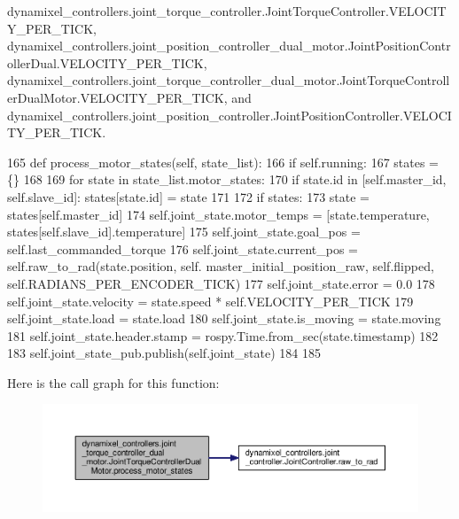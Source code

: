 dynamixel\+\_\+controllers.\+joint\+\_\+torque\+\_\+controller.\+Joint\+Torque\+Controller.\+V\+E\+L\+O\+C\+I\+T\+Y\+\_\+\+P\+E\+R\+\_\+\+T\+I\+CK, dynamixel\+\_\+controllers.\+joint\+\_\+position\+\_\+controller\+\_\+dual\+\_\+motor.\+Joint\+Position\+Controller\+Dual.\+V\+E\+L\+O\+C\+I\+T\+Y\+\_\+\+P\+E\+R\+\_\+\+T\+I\+CK, dynamixel\+\_\+controllers.\+joint\+\_\+torque\+\_\+controller\+\_\+dual\+\_\+motor.\+Joint\+Torque\+Controller\+Dual\+Motor.\+V\+E\+L\+O\+C\+I\+T\+Y\+\_\+\+P\+E\+R\+\_\+\+T\+I\+CK, and dynamixel\+\_\+controllers.\+joint\+\_\+position\+\_\+controller.\+Joint\+Position\+Controller.\+V\+E\+L\+O\+C\+I\+T\+Y\+\_\+\+P\+E\+R\+\_\+\+T\+I\+CK.


\begin{DoxyCode}
165     \textcolor{keyword}{def }process\_motor\_states(self, state\_list):
166         \textcolor{keywordflow}{if} self.running:
167             states = \{\}
168             
169             \textcolor{keywordflow}{for} state \textcolor{keywordflow}{in} state\_list.motor\_states:
170                 \textcolor{keywordflow}{if} state.id \textcolor{keywordflow}{in} [self.master\_id, self.slave\_id]: states[state.id] = state
171                 
172             \textcolor{keywordflow}{if} states:
173                 state = states[self.master\_id]
174                 self.joint\_state.motor\_temps = [state.temperature, states[self.slave\_id].temperature]
175                 self.joint\_state.goal\_pos = self.last\_commanded\_torque
176                 self.joint\_state.current\_pos = self.raw\_to\_rad(state.position, self.
      master\_initial\_position\_raw, self.flipped, self.RADIANS\_PER\_ENCODER\_TICK)
177                 self.joint\_state.error = 0.0
178                 self.joint\_state.velocity = state.speed * self.VELOCITY\_PER\_TICK
179                 self.joint\_state.load = state.load
180                 self.joint\_state.is\_moving = state.moving
181                 self.joint\_state.header.stamp = rospy.Time.from\_sec(state.timestamp)
182                 
183                 self.joint\_state\_pub.publish(self.joint\_state)
184 
185 
\end{DoxyCode}
Here is the call graph for this function\+:
\nopagebreak
\begin{figure}[H]
\begin{center}
\leavevmode
\includegraphics[width=350pt]{d1/d31/classdynamixel__controllers_1_1joint__torque__controller__dual__motor_1_1_joint_torque_controller_dual_motor_a97f500e3caad45a3050e41b31642cc5d_cgraph}
\end{center}
\end{figure}

